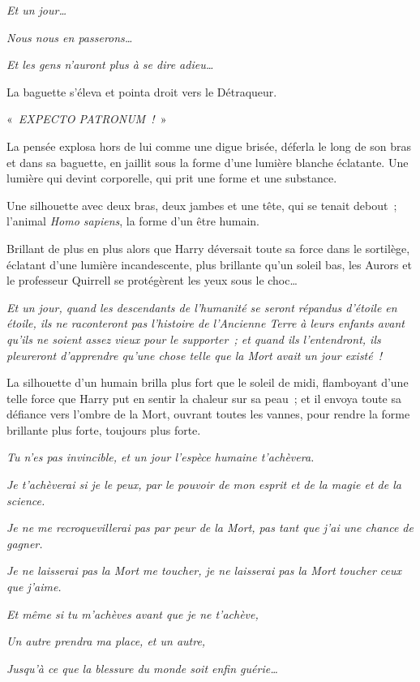 \emph{Et un jour…}

\emph{Nous nous en passerons…}

\emph{Et les gens n'auront plus à se dire adieu…}

La baguette s'éleva et pointa droit vers le Détraqueur.

«~\emph{EXPECTO PATRONUM~!}~»

La pensée explosa hors de lui comme une digue brisée, déferla le long de son bras et dans sa baguette, en jaillit sous la forme d'une lumière blanche éclatante. Une lumière qui devint corporelle, qui prit une forme et une substance.

Une silhouette avec deux bras, deux jambes et une tête, qui se tenait debout~; l'animal \emph{Homo sapiens}, la forme d'un être humain.

Brillant de plus en plus alors que Harry déversait toute sa force dans le sortilège, éclatant d'une lumière incandescente, plus brillante qu'un soleil bas, les Aurors et le professeur Quirrell se protégèrent les yeux sous le choc…

\emph{Et un jour, quand les descendants de l'humanité se seront répandus d'étoile en étoile, ils ne raconteront pas l'histoire de l'Ancienne Terre à leurs enfants avant qu'ils ne soient assez vieux pour le supporter~; et quand ils l'entendront, ils pleureront d'apprendre qu'une chose telle que la Mort avait un jour existé~!}

La silhouette d'un humain brilla plus fort que le soleil de midi, flamboyant d'une telle force que Harry put en sentir la chaleur sur sa peau~; et il envoya toute sa défiance vers l'ombre de la Mort, ouvrant toutes les vannes, pour rendre la forme brillante plus forte, toujours plus forte.

\emph{Tu n'es pas invincible, et un jour l'espèce humaine t'achèvera.}

\emph{Je t'achèverai si je le peux, par le pouvoir de mon esprit et de la magie et de la science.}

\emph{Je ne me recroquevillerai pas par peur de la Mort, pas tant que j'ai une chance de gagner.}

\emph{Je ne laisserai pas la Mort me toucher, je ne laisserai pas la Mort toucher ceux que j'aime.}

\emph{Et même si tu m'achèves avant que je ne t'achève,}

\emph{Un autre prendra ma place, et un autre,}

\emph{Jusqu'à ce que la blessure du monde soit enfin guérie…}

